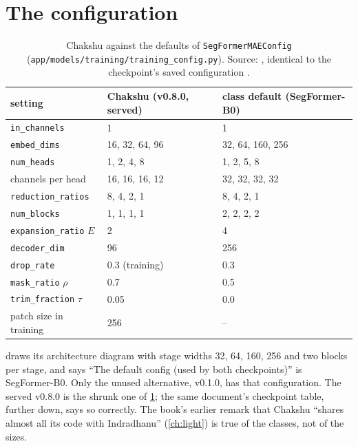 \section{The configuration}\label{sec:chakshu:config}

\begin{table}[htbp]
\centering\small
\begin{tabular}{lll}
\toprule
setting & Chakshu (v0.8.0, served) & class default (SegFormer-B0)\\
\midrule
\texttt{in\_channels} & 1 & 1\\
\texttt{embed\_dims} & 16, 32, 64, 96 & 32, 64, 160, 256\\
\texttt{num\_heads} & 1, 2, 4, 8 & 1, 2, 5, 8\\
channels per head & 16, 16, 16, 12 & 32, 32, 32, 32\\
\texttt{reduction\_ratios} & 8, 4, 2, 1 & 8, 4, 2, 1\\
\texttt{num\_blocks} & 1, 1, 1, 1 & 2, 2, 2, 2\\
\texttt{expansion\_ratio} $E$ & 2 & 4\\
\texttt{decoder\_dim} & 96 & 256\\
\texttt{drop\_rate} & 0.3 (training) & 0.3\\
\texttt{mask\_ratio} $\rho$ & 0.7 & 0.5\\
\texttt{trim\_fraction} $\tau$ & 0.05 & 0.0\\
patch size in training & 256 & --\\
\bottomrule
\end{tabular}
\caption{Chakshu against the defaults of \texttt{SegFormerMAEConfig} (\texttt{app/models/training/training\_config.py}).
Source: , identical to the checkpoint's saved configuration \tagC.}
\label{tab:chakshu:config}
\end{table}

\begin{sourcenote}
 draws its architecture diagram with stage widths 32, 64,
160, 256 and two blocks per stage, and says ``The default config (used by both checkpoints)'' is SegFormer-B0. Only
the unused alternative, v0.1.0, has that configuration. The served v0.8.0 is the shrunk one of
\cref{tab:chakshu:config}; the same document's checkpoint table, further down, says so correctly. The book's earlier
remark that Chakshu ``shares almost all its code with Indradhanu'' (\cref{ch:light}) is true of the classes, not of
the sizes.
\end{sourcenote}

